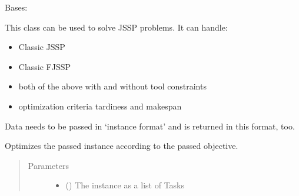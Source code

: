 \documentclass[letterpaper,10pt,english]{sphinxmanual}
\begin{document}
\begin{fulllineitems}
\label{\detokenize{agents.solver:agents.solver.solver.OrToolSolver}}
\sphinxAtStartPar
Bases: 

\sphinxAtStartPar
This class can be used to solve JSSP problems. It can handle:
\begin{itemize}
\item {} 
\sphinxAtStartPar
Classic JSSP

\item {} 
\sphinxAtStartPar
Classic FJSSP

\item {} 
\sphinxAtStartPar
both of the above with and without tool constraints

\item {} 
\sphinxAtStartPar
optimization criteria tardiness and makespan

\end{itemize}

\sphinxAtStartPar
Data needs to be passed in ‘instance format’ and is returned in this format, too.

\begin{fulllineitems}
\label{\detokenize{agents.solver:agents.solver.solver.OrToolSolver.optimize}}
\sphinxAtStartPar
Optimizes the passed instance according to the passed objective.
\begin{quote}\begin{description}
\item[{Parameters}] \leavevmode\begin{itemize}
\item {} 
\sphinxAtStartPar
{} (\sphinxstyleliteralemphasis{\sphinxupquote{{[}}}{\hyperref[\detokenize{data_generator:data_generator.task.Task}]{\sphinxcrossref{\sphinxstyleliteralemphasis{\sphinxupquote{Task}}}}}\sphinxstyleliteralemphasis{\sphinxupquote{{]}}}) \textendash{} The instance as a list of Tasks


\end{itemize}
\end{description}
\end{quote}
\end{fulllineitems}
\end{fulllineitems}
\end{document}

